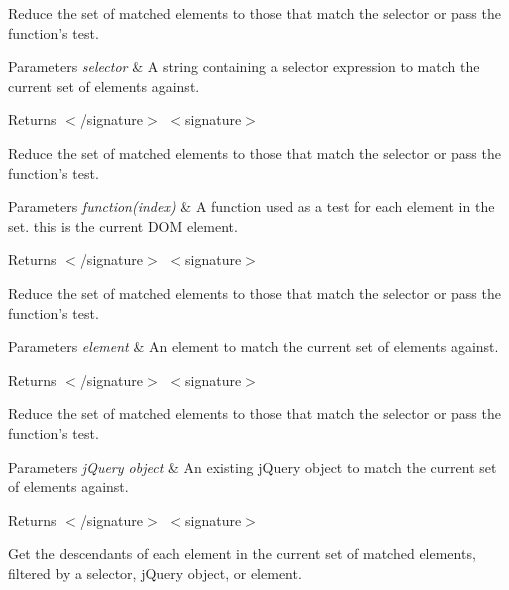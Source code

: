 Reduce the set of matched elements to those that match the selector or pass the function's test.


\begin{DoxyParams}{Parameters}
{\em selector} & A string containing a selector expression to match the current set of elements against.\\
\hline
\end{DoxyParams}
\begin{DoxyReturn}{Returns}
$<$/signature$>$ $<$signature$>$ 

Reduce the set of matched elements to those that match the selector or pass the function's test.
\end{DoxyReturn}

\begin{DoxyParams}{Parameters}
{\em function(index)} & A function used as a test for each element in the set. this is the current D\-O\-M element.\\
\hline
\end{DoxyParams}
\begin{DoxyReturn}{Returns}
$<$/signature$>$ $<$signature$>$ 

Reduce the set of matched elements to those that match the selector or pass the function's test.
\end{DoxyReturn}

\begin{DoxyParams}{Parameters}
{\em element} & An element to match the current set of elements against.\\
\hline
\end{DoxyParams}
\begin{DoxyReturn}{Returns}
$<$/signature$>$ $<$signature$>$ 

Reduce the set of matched elements to those that match the selector or pass the function's test.
\end{DoxyReturn}

\begin{DoxyParams}{Parameters}
{\em j\-Query object} & An existing j\-Query object to match the current set of elements against.\\
\hline
\end{DoxyParams}
\begin{DoxyReturn}{Returns}
$<$/signature$>$ $<$signature$>$ 

Get the descendants of each element in the current set of matched elements, filtered by a selector, j\-Query object, or element.
\end{DoxyReturn}

